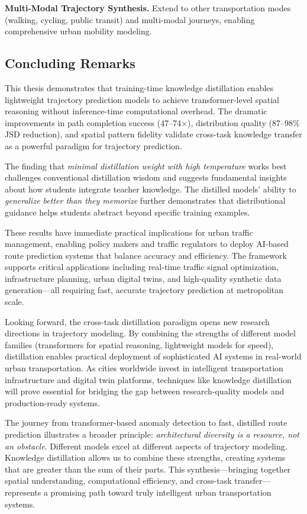\textbf{Multi-Modal Trajectory Synthesis.} Extend to other transportation modes (walking, cycling, public transit) and multi-modal journeys, enabling comprehensive urban mobility modeling.

\subsection{Concluding Remarks}
\label{sec:conclusion-remarks}

This thesis demonstrates that training-time knowledge distillation enables lightweight trajectory prediction models to achieve transformer-level spatial reasoning without inference-time computational overhead. The dramatic improvements in path completion success (47--74$\times$), distribution quality (87--98\% JSD reduction), and spatial pattern fidelity validate cross-task knowledge transfer as a powerful paradigm for trajectory prediction.

The finding that \emph{minimal distillation weight with high temperature} works best challenges conventional distillation wisdom and suggests fundamental insights about how students integrate teacher knowledge. The distilled models' ability to \emph{generalize better than they memorize} further demonstrates that distributional guidance helps students abstract beyond specific training examples.

These results have immediate practical implications for urban traffic management, enabling policy makers and traffic regulators to deploy AI-based route prediction systems that balance accuracy and efficiency. The framework supports critical applications including real-time traffic signal optimization, infrastructure planning, urban digital twins, and high-quality synthetic data generation—all requiring fast, accurate trajectory prediction at metropolitan scale.

Looking forward, the cross-task distillation paradigm opens new research directions in trajectory modeling. By combining the strengths of different model families (transformers for spatial reasoning, lightweight models for speed), distillation enables practical deployment of sophisticated AI systems in real-world urban transportation. As cities worldwide invest in intelligent transportation infrastructure and digital twin platforms, techniques like knowledge distillation will prove essential for bridging the gap between research-quality models and production-ready systems.

The journey from transformer-based anomaly detection to fast, distilled route prediction illustrates a broader principle: \emph{architectural diversity is a resource, not an obstacle}. Different models excel at different aspects of trajectory modeling. Knowledge distillation allows us to combine these strengths, creating systems that are greater than the sum of their parts. This synthesis—bringing together spatial understanding, computational efficiency, and cross-task transfer—represents a promising path toward truly intelligent urban transportation systems.

